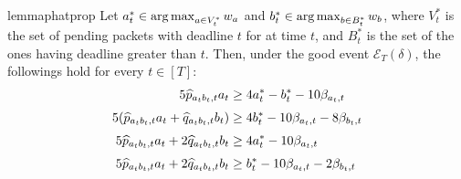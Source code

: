 \begin{restatable}{lemma}{phatprop}
    Let $a_t^* \in \operatorname*{arg\,max}_{a \in V_t^*} w_a$ and $b_t^* \in \operatorname*{arg\,max}_{b \in B_t^*} w_b$, where $V_t^*$ is the set of pending packets with deadline $t$ for \opt at time $t$, and $B_t^*$ is the set of the ones having deadline greater than $t$. 
    Then, under the good event $\mathcal{E}_T(\delta)$, the followings hold for every $t \in [T]$:
    \begin{subequations} \label{eq:phat_props}
    \begin{align}
        5\widehat{p}_{a_t b_t, t} a_t &\ge 4 a_t^* - b_t^* - 10\beta_{a_t, t}  \label{eq:phat_1}\\[3pt]
        5(\widehat{p}_{a_t b_t, t} a_t + \widehat{q}_{a_t b_t, t} b_t) &\ge 4b_t^* - 10 \beta_{a_t,t} -8\beta_{b_t, t}\label{eq:phat_2}\\[3pt]
        5\widehat{p}_{a_t b_t, t} a_t + 2\widehat{q}_{a_t b_t, t} b_t &\ge 4a_t^*- 10 \beta_{a_t,t} \label{eq:phat_3} \\[3pt]
        5\widehat{p}_{a_t b_t, t} a_t + 2\widehat{q}_{a_t b_t, t} b_t &\ge b_t^* - 10 \beta_{a_t,t}-2\beta_{b_t, t} \label{eq:phat_4}
    \end{align}
\end{subequations}
\end{restatable}
